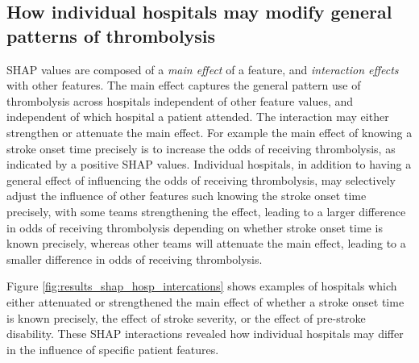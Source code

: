 
\subsection{How individual hospitals may modify general patterns of thrombolysis}

SHAP values are composed of a \emph{main effect} of a feature, and \emph{interaction effects} with other features. The main effect captures the general pattern use of thrombolysis across hospitals independent of other feature values, and independent of which hospital a patient attended. The interaction may either strengthen or attenuate the main effect. For example the main effect of knowing a stroke onset time precisely is to increase the odds of receiving thrombolysis, as indicated by a positive SHAP values. Individual hospitals, in addition to having a general effect of influencing the odds of receiving thrombolysis, may selectively adjust the influence of other features such knowing the stroke onset time precisely, with some teams strengthening the effect, leading to a larger difference in odds of receiving thrombolysis depending on whether stroke onset time is known precisely, whereas other teams will attenuate the main effect, leading to a smaller difference in odds of receiving thrombolysis.

Figure \ref{fig:results_shap_hosp_intercations} shows examples of hospitals which either attenuated or strengthened the main effect of whether a stroke onset time is known precisely, the effect of stroke severity, or the effect of pre-stroke disability. These SHAP interactions revealed how individual hospitals may differ in the influence of specific patient features.

